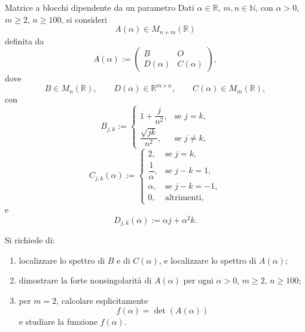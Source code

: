 \documentclass[a4paper]{article}
\begin{document}
\begin{snippetexercise}{Matrice a blocchi dipendente da un parametro}
    Dati \(\alpha\in\mathbb{R}\), \(m,n\in\mathbb{N}\), con \(\alpha>0\), \(m\geq 2\), \(n\geq 100\), si consideri
    \[
        A(\alpha)\in M_{n+m}(\mathbb{R})
    \]
    definita da
    \[
        A(\alpha):=
        \begin{pmatrix}
            B & O\\
            D(\alpha) & C(\alpha)
        \end{pmatrix},
    \]
    dove
    \[
        B\in M_n(\mathbb{R}),
        \qquad
        D(\alpha)\in\mathbb{R}^{m\times n},
        \qquad
        C(\alpha)\in M_m(\mathbb{R}),
    \]
    con
    \[
        B_{j,k}:=
        \begin{cases}
            1+\dfrac{j}{n^2}, & \text{se } j=k,\\[6pt]
            \dfrac{\sqrt{jk}}{n^2}, & \text{se } j\neq k,
        \end{cases}
    \]
    \[
        C_{j,k}(\alpha):=
        \begin{cases}
            2, & \text{se } j=k,\\[4pt]
            \dfrac{1}{\alpha}, & \text{se } j-k=1,\\[6pt]
            \alpha, & \text{se } j-k=-1,\\[4pt]
            0, & \text{altrimenti},
        \end{cases}
    \]
    e
    \[
        D_{j,k}(\alpha):=\alpha j+\alpha^2 k.
    \]

    Si richiede di:
    \begin{enumerate}
        \item localizzare lo spettro di \(B\) e di \(C(\alpha)\), e localizzare lo spettro di \(A(\alpha)\);
        \item dimostrare la forte nonsingolarità di \(A(\alpha)\) per ogni \(\alpha>0\), \(m\geq 2\), \(n\geq 100\);
        \item per \(m=2\), calcolare esplicitamente
            \[
                f(\alpha)=\det(A(\alpha))
            \]
            e studiare la funzione \(f(\alpha)\).
    \end{enumerate}
\end{snippetexercise}
\end{document}
